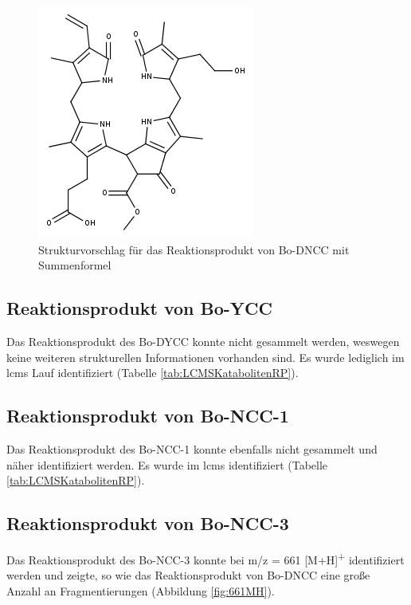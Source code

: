 \begin{figure}[!htbp]
  \centering
  \includegraphics[scale=0.6]{figures/Kapitel7/Kataboliten/fragmentation_structures/VWA_Katabolit_633.png}
  \caption[Strukturvorschlag für das Reaktionsprodukt von Bo-DNCC, Quelle: Autor]{Strukturvorschlag für das Reaktionsprodukt von Bo-DNCC mit Summenformel }
  \label{fig:633MStruktur}
\end{figure}

\pagebreak
\subsection{Reaktionsprodukt von Bo-YCC}

Das Reaktionsprodukt des Bo-DYCC konnte nicht gesammelt werden, weswegen keine weiteren strukturellen Informationen vorhanden sind. Es wurde lediglich im \gls{lcms} Lauf identifiziert (Tabelle \ref{tab:LCMSKatabolitenRP}).

\subsection{Reaktionsprodukt von Bo-NCC-1}

Das Reaktionsprodukt des Bo-NCC-1 konnte ebenfalls nicht gesammelt und näher identifiziert werden. Es wurde im \gls{lcms} identifiziert (Tabelle \ref{tab:LCMSKatabolitenRP}).

\pagebreak
\subsection{Reaktionsprodukt von Bo-NCC-3} \label{sec:ESIMSRPBoNCC3}

Das Reaktionsprodukt des Bo-NCC-3 konnte bei m/z = 661 [M+H]\textsuperscript{+} identifiziert werden und zeigte, so wie das Reaktionsprodukt von Bo-DNCC eine große Anzahl an Fragmentierungen (Abbildung \ref{fig:661MH}). 

